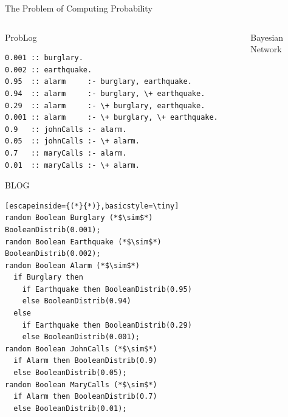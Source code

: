 \documentclass{beamer}
\begin{document}
\begin{frame}[fragile]{The Problem of Computing Probability}
  \vspace{-0.75cm}
  \begin{columns}[t]
    \begin{column}{0.6\textwidth}
      \centering
      \begin{block}{ProbLog}
        \vspace{-0.3cm}
        \begin{lstlisting}[basicstyle=\tiny]
0.001 :: burglary.
0.002 :: earthquake.
0.95  :: alarm     :- burglary, earthquake.
0.94  :: alarm     :- burglary, \+ earthquake.
0.29  :: alarm     :- \+ burglary, earthquake.
0.001 :: alarm     :- \+ burglary, \+ earthquake.
0.9   :: johnCalls :- alarm.
0.05  :: johnCalls :- \+ alarm.
0.7   :: maryCalls :- alarm.
0.01  :: maryCalls :- \+ alarm.
        \end{lstlisting}
        \vspace{-0.2cm}
      \end{block}
      \vspace{-0.25cm}
      \begin{block}{BLOG}
        \vspace{-0.3cm}
        \begin{lstlisting}[escapeinside={(*}{*)},basicstyle=\tiny]
random Boolean Burglary (*$\sim$*) BooleanDistrib(0.001);
random Boolean Earthquake (*$\sim$*) BooleanDistrib(0.002);
random Boolean Alarm (*$\sim$*)
  if Burglary then
    if Earthquake then BooleanDistrib(0.95)
    else BooleanDistrib(0.94)
  else
    if Earthquake then BooleanDistrib(0.29)
    else BooleanDistrib(0.001);
random Boolean JohnCalls (*$\sim$*)
  if Alarm then BooleanDistrib(0.9)
  else BooleanDistrib(0.05);
random Boolean MaryCalls (*$\sim$*)
  if Alarm then BooleanDistrib(0.7)
  else BooleanDistrib(0.01);
        \end{lstlisting}
        \vspace{-0.2cm}
      \end{block}
    \end{column}
    \begin{column}{0.35\textwidth}
      \begin{block}{Bayesian Network}
        \centering
\end{block}
\end{column}
\end{columns}
\end{frame}
\end{document}
